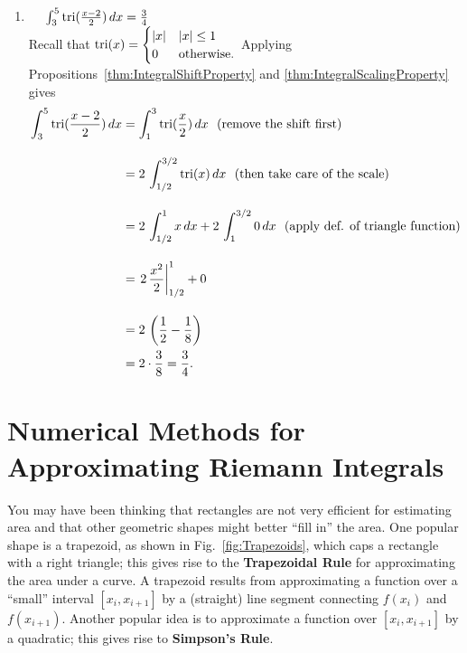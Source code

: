 \begin{enumerate}
     \item \Ans ~~ $\int_3^5 \mathrm{tri}(\frac{x-2}{2})\, dx = \frac{3}{4}$\\

     Recall that $\mathrm{tri}(x) = \begin{cases}
         |x| & |x| \le 1 \\
         0 & \text{otherwise}.
     \end{cases}$ Applying Propositions~\ref{thm:IntegralShiftProperty} and \ref{thm:IntegralScalingProperty} gives
 \begin{align*}
    \int_3^5 \mathrm{tri}(\frac{x-2}{2})\, dx & =  \int_{1}^{3} \mathrm{tri}(\frac{x}{2}) \, dx ~~(\text{remove the shift first})\\[1em]
    &= 2 \,  \int_{1/2}^{3/2} \mathrm{tri}(x) \, dx ~~(\text{then take care of the scale})\\[1em]
    &= 2 \,  \int_{1/2}^{1} x \, dx + 2 \,  \int_{1}^{3/2} 0 \, dx  ~~(\text{apply def. of triangle function})\\[1em]
    & = \left. 2 \, \frac{x^2}{2} \right|_{1/2}^{1} + 0 \\[1em]
    &= 2 \,\left( \frac{1}{2} - \frac{1}{8} \right) \\
    &= 2 \cdot \frac{3}{8} = \frac{3}{4}.
    \end{align*}

     
\end{enumerate}

\Qed

\section{Numerical Methods for Approximating Riemann Integrals}

You may have been thinking that rectangles are not very efficient for estimating area and that other geometric shapes might better ``fill in'' the area. One popular shape is a trapezoid, as shown in Fig.~\ref{fig:Trapezoids}, which caps a rectangle with a right triangle; this gives rise to the \textbf{Trapezoidal Rule} for approximating the area under a curve. A trapezoid results from approximating a function over a ``small'' interval $[x_i, x_{i+1}]$ by a (straight) line segment connecting $f(x_i)$ and $f(x_{i+1})$. Another popular idea is to approximate a function over  $[x_i, x_{i+1}]$ by a quadratic; this gives rise to \textbf{Simpson's Rule}. 

